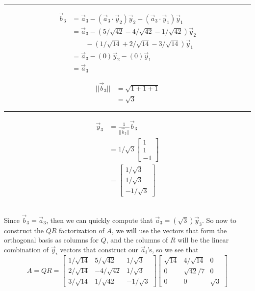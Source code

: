 \documentclass{report}
\begin{document}
{$$\begin{aligned}
\end{aligned}
$$
\vspace{0.5em}
\hrule
\vspace{0.5em}
\begin{minipage}{0.45\textwidth}
$$
\begin{aligned}
\vec{b}_3 &= \vec{a}_3 - (\vec{a}_3\cdot\vec{y}_2)\vec{y}_2 - (\vec{a}_3\cdot\vec{y}_1)\vec{y}_1\\
&= \vec{a}_3 - (5/\sqrt{42} - 4/\sqrt{42} - 1/\sqrt{42})\vec{y}_2 \\ 
&\qquad- (1/\sqrt{14} + 2/\sqrt{14} - 3/\sqrt{14})\vec{y}_1\\
&= \vec{a}_3 - (0)\vec{y}_2 - (0)\vec{y}_1\\
&=\vec{a}_3
\end{aligned}
$$
\end{minipage}
\begin{minipage}{0.45\textwidth}
$$
\begin{aligned}
||\vec{b}_3|| &= \sqrt{1+1+1}\\
&=\sqrt{3}
\end{aligned}
$$
\hrule
\vspace{0.5em}
$$
\begin{aligned}
\vec{y}_3 &= \frac{1}{||\vec{b}_3||}\vec{b}_3\\
&=1/\sqrt{3}\begin{bmatrix}1\\1\\-1\end{bmatrix}\\
&=\begin{bmatrix}1/\sqrt{3}\\1/\sqrt{3}\\-1/\sqrt{3}\end{bmatrix}
\end{aligned}
$$
\end{minipage}\\
Since $\vec{b}_3 = \vec{a}_3$,  then we can quickly compute that $\vec{a}_3 = (\sqrt{3})\vec{y}_3$.
\newpage
\noindent So now to construct the $QR$ factorization of $A$,  we will use the vectors that form the orthogonal basis as columns for $Q$,  and the columns of $R$ will be the linear combination of $\vec{y}_i$ vectors that construct our $\vec{a}_i$'s,  so we see that
$$
A = QR = \begin{bmatrix}
1/\sqrt{14}&5/\sqrt{42}&1/\sqrt{3}\\
2/\sqrt{14}&-4/\sqrt{42}&1/\sqrt{3}\\
3/\sqrt{14}&1/\sqrt{42}&-1/\sqrt{3}
\end{bmatrix}
\begin{bmatrix}
\sqrt{14}&4/\sqrt{14}&0\\
0&\sqrt{42}/7&0\\
0&0&\sqrt{3}
\end{bmatrix}
$$}
\end{document}
